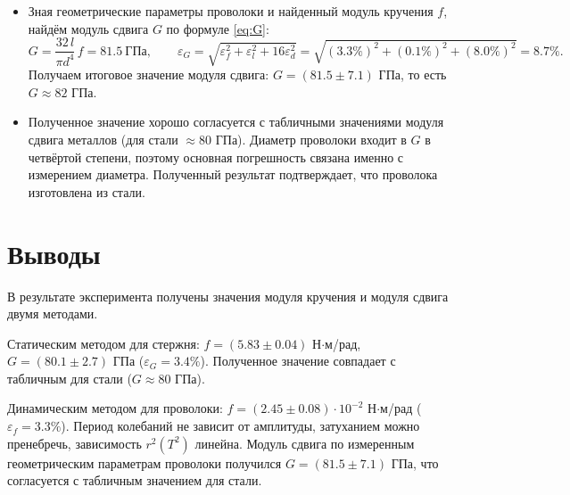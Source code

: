 \documentclass[12pt,a4paper]{article}
\begin{document}
\begin{itemize}
    \item Зная геометрические параметры проволоки и найденный модуль кручения $f$, найдём модуль сдвига $G$ по формуле \eqref{eq:G}:
    \[
        G = \frac{32\,l}{\pi d^4}\,f = 81.5~\text{ГПа}, \qquad
        \varepsilon_G = \sqrt{\varepsilon_f^2 + \varepsilon_l^2 + 16\varepsilon_d^2} = \sqrt{\left(3.3\%\right)^2 + \left(0.1\%\right)^2 + \left(8.0\%\right)^2} = 8.7\%.
    \]
    Получаем итоговое значение модуля сдвига: $G = (81.5 \pm 7.1)$ ГПа, то есть $G \approx 82$ ГПа.

    \item Полученное значение хорошо согласуется с табличными значениями модуля сдвига металлов (для стали $\approx 80$ ГПа). Диаметр проволоки входит в $G$ в четвёртой степени, поэтому 
    основная погрешность связана именно с измерением диаметра. Полученный результат подтверждает, что проволока изготовлена из стали.
\end{itemize}

\section{Выводы}

В результате эксперимента получены значения модуля кручения и модуля сдвига двумя методами.

Статическим методом для стержня: $f = (5.83 \pm 0.04)$ Н$\cdot$м/рад, $G = (80.1 \pm 2.7)$ ГПа ($\varepsilon_G = 3.4\%$). Полученное значение совпадает с табличным для стали ($G\approx 80$ ГПа).

Динамическим методом для проволоки: $f = (2.45 \pm 0.08)\cdot10^{-2}$ Н$\cdot$м/рад ($\varepsilon_f = 3.3\%$). Период колебаний не зависит от амплитуды,
затуханием можно пренебречь, зависимость $r^2(T^2)$ линейна. Модуль сдвига по измеренным геометрическим параметрам проволоки получился $G = (81.5 \pm 7.1)$ ГПа, что  согласуется с табличным значением для стали.
\end{document}
